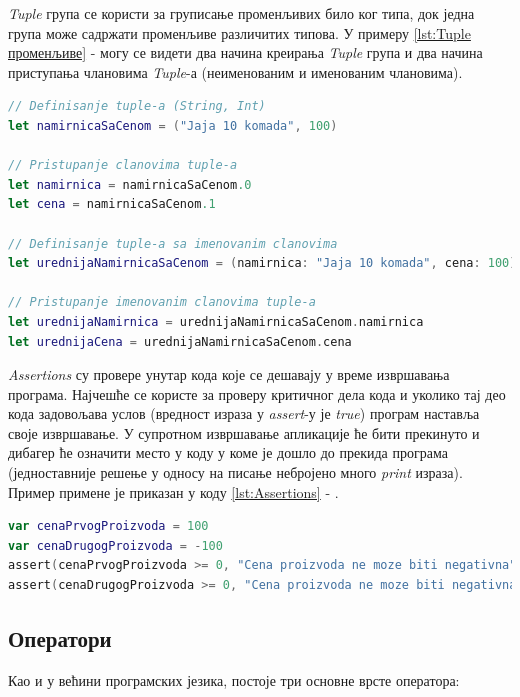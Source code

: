 \documentclass[12pt,oneside]{memoir}
\begin{document}
\indent \textit{Tuple} група се користи за груписање променљивих било ког типа, док једна група може садржати променљиве различитих типова. У примеру \ref{lst:Tuple променљиве} -  могу се видети два начина креирања \textit{Tuple} група и два начина приступања члановима \textit{Tuple}-а (неименованим и именованим члановима).

\begin{lstlisting}[caption=\textit{{Tuple променљиве}}, label={lst:Tuple променљиве}, language=Swift, frame=single]
// Definisanje tuple-a (String, Int)
let namirnicaSaCenom = ("Jaja 10 komada", 100)

// Pristupanje clanovima tuple-a
let namirnica = namirnicaSaCenom.0
let cena = namirnicaSaCenom.1

// Definisanje tuple-a sa imenovanim clanovima
let urednijaNamirnicaSaCenom = (namirnica: "Jaja 10 komada", cena: 100)

// Pristupanje imenovanim clanovima tuple-a
let urednijaNamirnica = urednijaNamirnicaSaCenom.namirnica
let urednijaCena = urednijaNamirnicaSaCenom.cena
\end{lstlisting}

\indent \textit{Assertions} су провере унутар кода које се дешавају у време извршавања програма. Најчешће се користе за проверу критичног дела кода и уколико тај део кода задовољава услов (вредност израза у \textit{assert}-у је \textit{true}) програм наставља своје извршавање. У супротном извршавање апликације ће бити прекинуто и дибагер ће означити место у коду у коме је дошло до прекида програма (једноставније решење у односу на писање небројено много \textit{print} израза). Пример примене је приказан у коду \ref{lst:Assertions} - .

\begin{lstlisting}[caption=\textit{{Assertions}}, label={lst:Assertions}, language=Swift, frame=single]
var cenaPrvogProizvoda = 100
var cenaDrugogProizvoda = -100
assert(cenaPrvogProizvoda >= 0, "Cena proizvoda ne moze biti negativna") //true
assert(cenaDrugogProizvoda >= 0, "Cena proizvoda ne moze biti negativna") //false
\end{lstlisting}

\subsection{Оператори}

\indent Као и у већини програмских језика, постоје три основне врсте оператора: 
\end{document}
